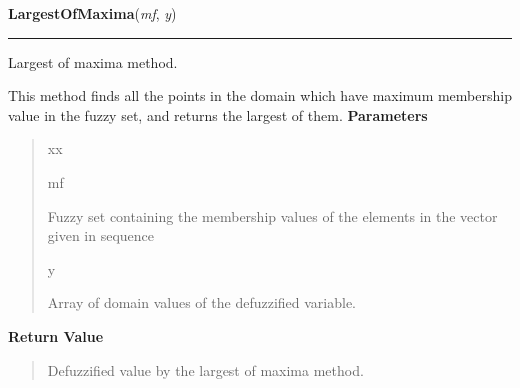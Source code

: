 \hspace{.8\funcindent}\begin{boxedminipage}{\funcwidth}

    \raggedright \textbf{LargestOfMaxima}(\textit{mf}, \textit{y})

    \vspace{-1.5ex}

    \rule{\textwidth}{0.5\fboxrule}
\setlength{\parskip}{2ex}

Largest of maxima method.

This method finds all the points in the domain which have maximum membership
value in the fuzzy set, and returns the largest of them.
\setlength{\parskip}{1ex}
      \textbf{Parameters}
      \vspace{-1ex}

      \begin{quote}
        \begin{Ventry}{xx}

          \item[mf]


Fuzzy set containing the membership values of the elements in the
vector given in sequence
          \item[y]


Array of domain values of the defuzzified variable.
        \end{Ventry}

      \end{quote}

      \textbf{Return Value}
    \vspace{-1ex}

      \begin{quote}

Defuzzified value by the largest of maxima method.
      \end{quote}

    \end{boxedminipage}

    \label{peach:fuzzy:defuzzy:MeanOfMaxima}

    \vspace{0.5ex}

